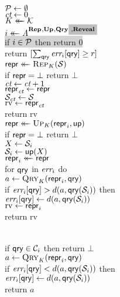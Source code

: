 \begin{figure*}[t]
{
  \\[2pt]
    $\setP \gets \emptyset$\\
    $\ct \gets 0$ \\
    $\key \getsr \keys$\\
    $i \getsr \advA^{\REPO,\UPO,\QRYO\highlighto{,\REVO}}$\\
    \colorbox{lightgray}{if $i \in \setP$ then return 0} \\[2.0pt]
    return $[\sum_\qry \err_i[\qry] \geq r]$ 
}
{
    \oraclev{$\REPO(\col)$}\\[2pt]
      $\pub \getsr \Rep_\key(\col)$\\
      if $\pub = \bot$ return $\bot$\\
      $\ct\gets\ct+1$ \\
      $\pub_\ct \gets \pub$\\
      $\col_\ct \gets \col$\\
      $\mathrm{rv} \gets \pub_\ct$  \\
      return $\mathrm{rv}$
  }
  {
    \\[2pt]
      $\pub \getsr \Up_\key(\pub_i, \up)$\\
      if $\pub = \bot$ return $\bot$\\
      $X \gets \col_i$ \\
      $\col_i \gets \up(X)$\\
      $\pub_i \getsr \pub$\\
      for $\qry$ in $\err_i$ do\\
      \tab $a \gets \Qry_K(\pub_i, \qry)$\\
      \tab if $\err_i[\qry] > d(a,\qry(\col_i))$ then\\
      \tab\tab$\err_i[\qry] \gets d(a,\qry(\col_i))$\\
      $\mathrm{rv} \gets \pub_i$ \\
      return $\mathrm{rv}$
      \medskip
}
{
    \\[2pt]
      if $\qry \in \setC_i$ then return $\bot$\\
      $a \gets \Qry_K(\pub_i, \qry)$\\
      if $\err_i[\qry] < d(a,\qry(\col_i))$ then\\
      \tab$\err_i[\qry] \gets d(a,\qry(\col_i))$\\
      return $a$


}
\end{figure*}
